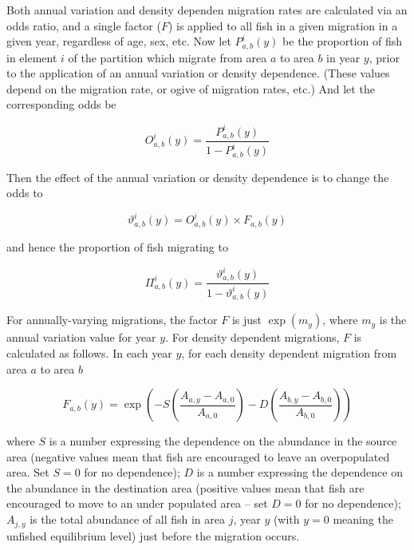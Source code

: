 Both annual variation and density dependen migration rates are calculated via an odds ratio, and a single factor ($F$) is applied to all fish in a given migration in a given year, regardless of age, sex, etc. Now let $P^i_{a,b}(y)$  be the proportion of fish in element $i$ of the partition which migrate from area $a$ to area $b$ in year $y$, prior to the application of an annual variation or density dependence. (These values depend on the migration rate, or ogive of migration rates, etc.) And let the corresponding odds be

\begin{equation}
O^i_{a,b} (y) = \frac{P^i_{a,b}(y)}{1 - P^i_{a,b}(y)}
\end{equation}

Then the effect of the annual variation or density dependence is to change the odds to

 \begin{equation}
 \vartheta^i_{a,b} (y) = O^i_{a,b}(y) \times F_{a,b}(y)
 \end{equation}

and hence the proportion of fish migrating to

\begin{equation}
\Pi^i_{a,b} (y) = \frac{\vartheta^i_{a,b}(y)}{1 - \vartheta^i_{a,b}(y)}
\end{equation}

For annually-varying migrations, the factor $F$ is just $\exp(m_y)$, where $m_y$ is the annual variation value for year $y$.  For density dependent migrations, $F$ is calculated as follows. In each year $y$, for each density dependent migration from area $a$ to area $b$

 \begin{equation}
 F_{a,b}(y) = \exp \left( -S \left( \frac{A_{a,y} - A_{a,0}}{A_{a,0}}\right) -D \left( \frac{A_{b,y} - A_{b,0}}{A_{b,0}} \right) \right)
 \end{equation}

where $S$ is a number expressing the dependence on the abundance in the source area (negative values mean that fish are encouraged to leave an overpopulated area. Set $S=0$ for no dependence); $D$ is a number expressing the dependence on the abundance in the destination area (positive values mean that fish are encouraged to move to an under populated area \mbox{--} set $D=0$ for no dependence); $A_{j,y}$ is the total abundance of all fish in area $j$, year $y$ (with $y=0$ meaning the unfished equilibrium level) just before the migration occurs.

